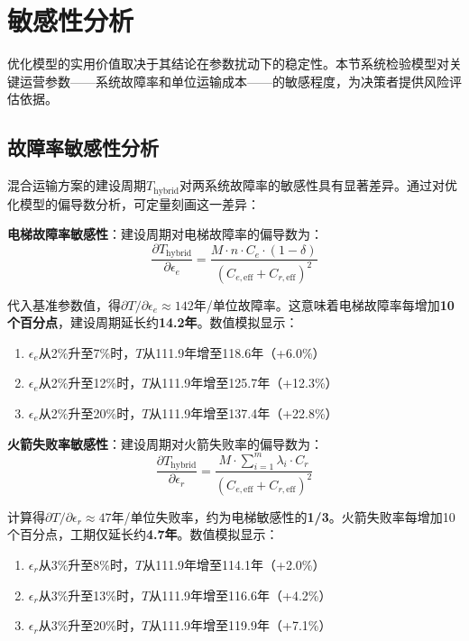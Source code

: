 \section{敏感性分析}

优化模型的实用价值取决于其结论在参数扰动下的稳定性。本节系统检验模型对关键运营参数——系统故障率和单位运输成本——的敏感程度，为决策者提供风险评估依据。

\subsection{故障率敏感性分析}

混合运输方案的建设周期$T_{\text{hybrid}}$对两系统故障率的敏感性具有显著差异。通过对优化模型的偏导数分析，可定量刻画这一差异：

\textbf{电梯故障率敏感性}：建设周期对电梯故障率的偏导数为：
\begin{equation}
    \frac{\partial T_{\text{hybrid}}}{\partial \epsilon_e} = \frac{M \cdot n \cdot C_e \cdot (1-\delta)}{(C_{e,\text{eff}} + C_{r,\text{eff}})^2}
\end{equation}

代入基准参数值，得$\partial T / \partial \epsilon_e \approx 142$年/单位故障率。这意味着电梯故障率每增加\textbf{10个百分点}，建设周期延长约\textbf{14.2年}。数值模拟显示：
\begin{enumerate}
    \item $\epsilon_e$从2\%升至7\%时，$T$从111.9年增至118.6年（+6.0\%）
    \item $\epsilon_e$从2\%升至12\%时，$T$从111.9年增至125.7年（+12.3\%）
    \item $\epsilon_e$从2\%升至20\%时，$T$从111.9年增至137.4年（+22.8\%）
\end{enumerate}

\textbf{火箭失败率敏感性}：建设周期对火箭失败率的偏导数为：
\begin{equation}
    \frac{\partial T_{\text{hybrid}}}{\partial \epsilon_r} = \frac{M \cdot \sum_{i=1}^{m}\lambda_i \cdot C_r}{(C_{e,\text{eff}} + C_{r,\text{eff}})^2}
\end{equation}

计算得$\partial T / \partial \epsilon_r \approx 47$年/单位失败率，约为电梯敏感性的\textbf{1/3}。火箭失败率每增加10个百分点，工期仅延长约\textbf{4.7年}。数值模拟显示：
\begin{enumerate}
    \item $\epsilon_r$从3\%升至8\%时，$T$从111.9年增至114.1年（+2.0\%）
    \item $\epsilon_r$从3\%升至13\%时，$T$从111.9年增至116.6年（+4.2\%）
    \item $\epsilon_r$从3\%升至20\%时，$T$从111.9年增至119.9年（+7.1\%）
\end{enumerate}

